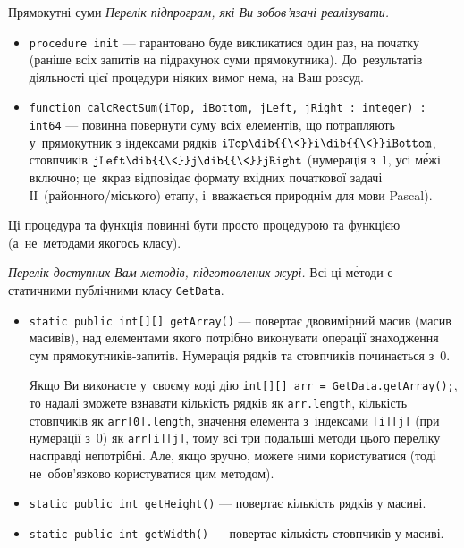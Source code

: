 \begin{problemAllDefault}{Прямокутні суми}
\medskip
\noindent\emph{Перелік підпрограм, які Ви зобов'язані реалізувати.}
\begin{itemize}
\item
\texttt{procedure init} --- гарантовано буде викликатися один раз, на початку (раніше всіх запитів на підрахунок суми прямокутника). До~результатів діяльності цієї процедури ніяких вимог нема, на Ваш розсуд.
\item
\texttt{function calcRectSum(iTop, iBottom, jLeft, jRight : integer) : int64} --- повинна повернути суму всіх елементів, що потрапляють у~прямокутник з індексами рядків 
$\texttt{iTop}\dib{{\<}}\texttt{i}\dib{{\<}}\texttt{iBottom}$,
стовпчиків
$\texttt{jLeft}\dib{{\<}}\texttt{j}\dib{{\<}}\texttt{jRight}$
(нумерація з~1, усі м\'{е}жі включно; це~якраз відповідає формату вхідних початкової задачі ІІ~(районного/\nolinebreak[2]міського) етапу, і~вважається природнім для мови Pascal).

\end{itemize}
Ці процедура та функція повинні бути просто процедурою та функцією (а~не~методами якогось класу).


\par\noindent\emph{Перелік доступних Вам методів, підготовлених журі.} 
Всі ці м\'{е}тоди є статичними публічними класу \texttt{GetData}. 

\begin{itemize}
\item
\texttt{static public int[][] getArray()} --- повертає двовимірний масив (масив масивів), над елементами якого потрібно виконувати операції знаходження сум прямокутників-запитів. Нумерація рядків та стовпчиків починається з~0.

Якщо Ви виконаєте у~своєму коді дію \texttt{int[][] arr = GetData.getArray();}, то надалі зможете взнавати кількість рядків як \texttt{arr.length}, кількість стовпчиків як \texttt{arr[0].length}, значення елемента з~індексами \texttt{[i][j]} (при нумерації з~0) як \texttt{arr[i][j]}, тому всі три подальші методи цього переліку насправді непотрібні. Але, якщо зручно, можете ними користуватися (тоді не~обов'язково користуватися цим методом).

\item
\texttt{static public int getHeight()} --- повертає кількість рядків у масиві.

\item
\texttt{static public int getWidth()} --- повертає кількість стовпчиків у масиві.


\end{itemize}
\end{problemAllDefault}
